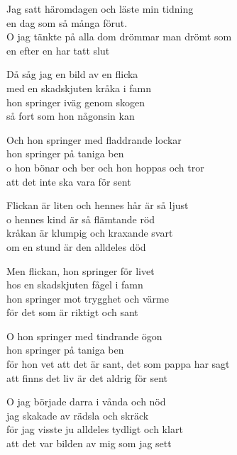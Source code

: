 \vspace{10pt}
Jag satt häromdagen och läste min tidning\\
en dag som så många förut.\\
O jag tänkte på alla dom drömmar man drömt som\\
en efter en har tatt slut\par
\vspace{10pt}
Då såg jag en bild av en flicka\\
med en skadskjuten kråka i famn\\
hon springer iväg genom skogen\\
så fort som hon någonsin kan\par
\vspace{10pt}
Och hon springer med fladdrande lockar\\
hon springer på taniga ben\\
o hon bönar och ber och hon hoppas och tror\\
att det inte ska vara för sent\par
\vspace{10pt}
Flickan är liten och hennes hår är så ljust\\
o hennes kind är så flämtande röd\\
kråkan är klumpig och kraxande svart\\
om en stund är den alldeles död\par
\vspace{10pt}
Men flickan, hon springer för livet\\
hos en skadskjuten fågel i famn\\
hon springer mot trygghet och värme\\
för det som är riktigt och sant\par
\vspace{10pt}
O hon springer med tindrande ögon\\
hon springer på taniga ben\\
för hon vet att det är sant, det som pappa har sagt\\
att finns det liv är det aldrig för sent\par
\vspace{10pt}
O jag började darra i vånda och nöd\\
jag skakade av rädsla och skräck\\
för jag visste ju alldeles tydligt och klart\\
att det var bilden av mig som jag sett\par
